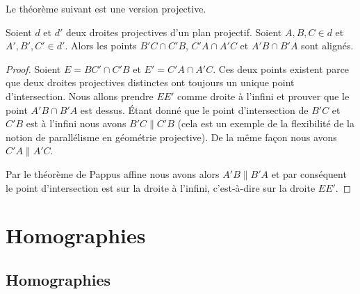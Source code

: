 Le théorème suivant est une version projective.
\begin{theorem}     
    Soient \( d\) et \( d'\) deux droites projectives d'un plan projectif. Soient \( A,B,C\in d\) et \( A',B',C'\in d'\). Alors les points \( B'C\cap C'B\), \( C'A\cap A'C\) et \( A'B\cap B'A\) sont alignés.
\end{theorem}

\begin{proof}
    Soient \( E=BC'\cap C'B\) et \( E'=C'A\cap A'C\). Ces deux points existent parce que deux droites projectives distinctes ont toujours un unique point d'intersection. Nous allons prendre \( EE'\) comme droite à l'infini et prouver que le point \( A'B\cap B'A\) est dessus. Étant donné que le point d'intersection de \( B'C\) et \( C'B\) est à l'infini nous avons \( B'C\parallel C'B\) (cela est un exemple de la flexibilité de la notion de parallélisme en géométrie projective). De la même façon nous avons \( C'A\parallel A'C\).

    Par le théorème de Pappus affine nous avons alors \( A'B\parallel B'A\) et par conséquent le point d'intersection est sur la droite à l'infini, c'est-à-dire sur la droite \( EE'\).
\end{proof}

\section{Homographies}

\subsection{Homographies}

